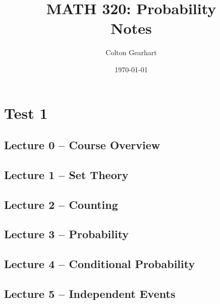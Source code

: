 \documentclass{article}
\title{MATH 320: Probability\\ Notes}
\author{Colton Gearhart}
\date{\today}
\begin{document}
\setcounter{secnumdepth}{0}		%
\maketitle
\dosecttoc
\tableofcontents
\newpage

\section{Test 1}

\secttoc

\subsection{Lecture 0 -- Course Overview}
\newpage

\subsection{Lecture 1 -- Set Theory}
\newpage

\subsection{Lecture 2 -- Counting}
\newpage

\subsection{Lecture 3 -- Probability}
\newpage

\subsection{Lecture 4 -- Conditional Probability}
\newpage

\subsection{Lecture 5 -- Independent Events}
\newpage
\end{document}
